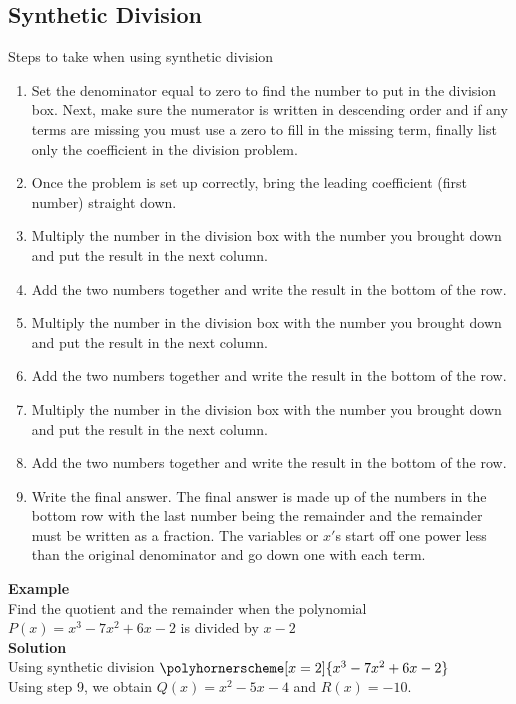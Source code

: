 \documentclass[11pt,a4paper]{article}
\begin{document}
\subsection{Synthetic Division}
Steps to take when using synthetic division
\begin{enumerate}
\item Set the denominator equal to zero to find the number to put in the division box. Next, make sure the numerator is written in descending order and if any terms are missing you must use a zero to fill in the missing term, finally list only the coefficient in the division problem.
\item Once the problem is set up correctly, bring the leading coefficient (first number) straight down.
\item Multiply the number in the division box with the number you brought down and put the result in the next column.
\item Add the two numbers together and write the result in the bottom of the row.
\item Multiply the number in the division box with the number you brought down and put the result in the next column.
\item Add the two numbers together and write the result in the bottom of the row.
\item Multiply the number in the division box with the number you brought down and put the result in the next column.
\item Add the two numbers together and write the result in the bottom of the row.
\item Write the final answer. The final answer is made up of the numbers in the bottom row with the last number being the remainder and the remainder must be written as a fraction. The variables or $x'$s start off one power less than the original denominator and go down one with each term.\\
\end{enumerate}


\textbf{Example}\\
Find the quotient and the remainder when the polynomial $P(x)=x^3-7x^2+6x-2$ is divided by $x-2$\\

\textbf{Solution}\\
Using synthetic division
$\polyhornerscheme[x=2]{x^3-7x^2+6x-2}$\\

Using step 9, we obtain $Q(x)=x^2-5x-4$ and $R(x)=-10$.\\\\
\end{document}
